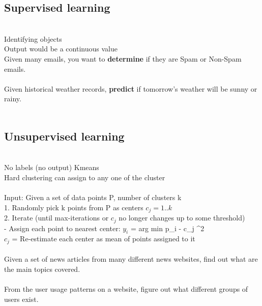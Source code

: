 \documentclass[11pt]{article}
\begin{document}
\subsection*{Supervised learning}\\
Identifying objects \\
Output would be a continuous value\\
Given many emails, you want to \textbf{determine} if they are Spam or Non-Spam emails.
\\
\\
Given historical weather records, \textbf{predict} if tomorrow's weather will be sunny or rainy.
\\\\
\subsection*{Unsupervised learning}\\
No labels (no output)
Kmeans 
\\
Hard clustering can assign to any one of the cluster\\
\\
Input: Given a set of data points P, number of clusters k
\\1. Randomly pick k points from P as centers $c_{j} = 1.. k$
 \\2.
Iterate (until max-iterations or $c_{j}$ no longer changes up to some threshold) \\
- Assign each point to nearest center: $y_{i}$ = arg min {\parallel p_{i} - c_{j} \parallel}^{2}\)
\\
$c_{j}$ =  Re-estimate each center as mean of points assigned to it
\\\\
Given a set of news articles from many different news websites, find out what are the main topics covered.
\\\\
From the user usage patterns on a website, figure out what different groups of users exist.
\\\\
\end{document}
